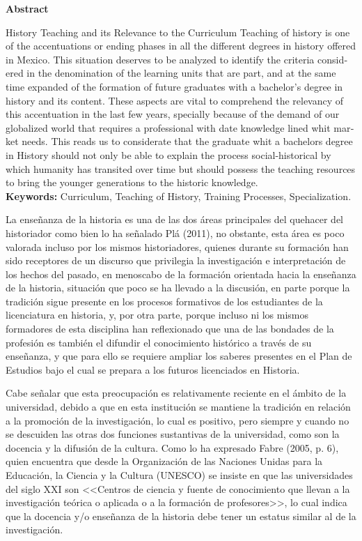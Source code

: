 \medskip
\textenglish{{\bfseries Abstract}}

\textenglish{History Teaching and its Relevance to the Curriculum 
Teaching of history is one of the accentuations or ending phases in all 
the different degrees in history offered in Mexico. This situation 
deserves to be analyzed to identify the criteria considered in the 
denomination of the learning units that are part, and at the same time 
expanded of the formation of future graduates with a bachelor's degree 
in history and its content. These aspects are vital to comprehend the 
relevancy of this accentuation in the last few years, specially because 
of the demand of our globalized world that requires a professional with 
date knowledge lined whit market needs. This reads us to considerate 
that the graduate whit a bachelors degree in History should not only be 
able to explain the process social-historical by which humanity has 
transited over time but should possess the teaching resources to bring 
the younger generations to the historic knowledge.}\\ 
\textenglish{\textbf{Keywords:} Curriculum, Teaching of History, 
Training Processes, Specialization.}

\medskip 
\noindent La enseñanza de la historia es una de las dos áreas  
principales del quehacer del historiador como bien lo ha señalado Plá 
(2011), no obstante, esta área es poco valorada incluso por los mismos 
historiadores, quienes durante su formación han sido receptores de un 
discurso que privilegia la investigación e interpretación de los hechos 
del pasado, en  menoscabo de la formación orientada hacia la enseñanza 
de la historia, situación que poco se ha llevado a la discusión, en 
parte porque la tradición sigue presente en los procesos formativos de 
los estudiantes de la licenciatura en historia, y, por otra parte, 
porque incluso ni los mismos formadores de esta disciplina han 
reflexionado que una de las bondades de la profesión es también el 
difundir el conocimiento histórico a través de su enseñanza, y que para 
ello se requiere ampliar los saberes presentes en el Plan de Estudios 
bajo el cual se prepara a los futuros licenciados en Historia.  

Cabe señalar que esta preocupación es relativamente reciente en el 
ámbito de la universidad, debido a que en esta institución se mantiene 
la tradición en relación a la promoción de la investigación, lo cual es 
positivo, pero siempre y cuando no se descuiden las otras dos funciones 
sustantivas de la universidad, como son la docencia y la difusión de la 
cultura. Como lo  ha expresado Fabre (2005, p. 6), quien encuentra que desde 
la Organización de las Naciones Unidas para la Educación, la Ciencia y 
la Cultura (UNESCO) se insiste en que las universidades del siglo XXI 
son <<Centros de ciencia y fuente de conocimiento que llevan a la 
investigación teórica o aplicada o a la formación de profesores>>, lo 
cual indica que la docencia y\slash{}o enseñanza de la historia debe 
tener un estatus similar al de la investigación.
 
